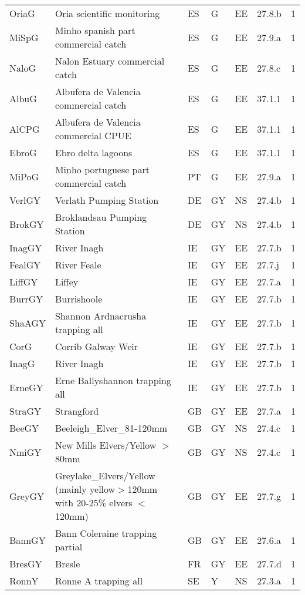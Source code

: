 \begin{table}[htbp]
\begin{tabularx}{\textwidth}{p{1.3cm}p{6.5cm}p{1cm}p{1cm}p{1cm}p{1cm}p{1.4cm}}
  OriaG & Oria scientific monitoring & ES & G & EE & 27.8.b &   1 \\ 
  MiSpG & Minho spanish part commercial catch & ES & G & EE & 27.9.a &   1 \\ 
  NaloG & Nalon Estuary commercial catch & ES & G & EE & 27.8.c &   1 \\ 
  AlbuG & Albufera de Valencia commercial catch & ES & G & EE & 37.1.1 &   1 \\ 
  AlCPG & Albufera de Valencia commercial CPUE & ES & G & EE & 37.1.1 &   1 \\ 
  EbroG & Ebro delta lagoons & ES & G & EE & 37.1.1 &   1 \\ 
  MiPoG & Minho portuguese part commercial catch & PT & G & EE & 27.9.a &   1 \\ 
  VerlGY & Verlath Pumping Station & DE & GY & NS & 27.4.b &   1 \\ 
  BrokGY & Broklandsau Pumping Station & DE & GY & NS & 27.4.b &   1 \\ 
  InagGY & River Inagh & IE & GY & EE & 27.7.b &   1 \\ 
  FealGY & River Feale & IE & GY & EE & 27.7.j &   1 \\ 
  LiffGY & Liffey & IE & GY & EE & 27.7.a &   1 \\ 
  BurrGY & Burrishoole & IE & GY & EE & 27.7.b &   1 \\ 
  ShaAGY & Shannon Ardnacrusha trapping all & IE & GY & EE & 27.7.b &   1 \\ 
  CorG & Corrib Galway Weir & IE & GY & EE & 27.7.b &   1 \\ 
  InagG & River Inagh & IE & GY & EE & 27.7.b &   1 \\ 
  ErneGY & Erne Ballyshannon trapping all & IE & GY & EE & 27.7.b &   1 \\ 
  StraGY & Strangford & GB & GY & EE & 27.7.a &   1 \\ 
  BeeGY & Beeleigh\_Elver\_81-120mm & GB & GY & NS & 27.4.c &   1 \\ 
  NmiGY & New Mills Elvers/Yellow $>$80mm & GB & GY & NS & 27.4.c &   1 \\ 
  GreyGY & Greylake\_Elvers/Yellow (mainly yellow$>$120mm with 20-25\% elvers $<$120mm) & GB & GY & EE & 27.7.g &   1 \\ 
  BannGY & Bann Coleraine trapping partial & GB & GY & EE & 27.6.a &   1 \\ 
  BresGY & Bresle & FR & GY & EE & 27.7.d &   1 \\ 
  RonnY & Ronne A  trapping all & SE & Y & NS & 27.3.a &   1 \\ 

\end{tabularx}
\end{table}
